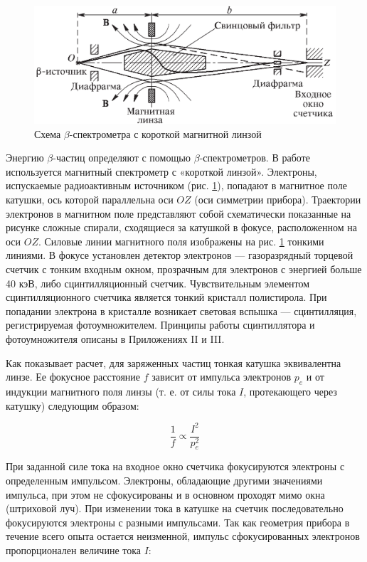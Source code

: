 \documentclass[a4paper,12pt]{article}
\begin{document}
\FloatBarrier
\begin{figure}[h]
    \begin{center}
        \includegraphics[width = 1\textwidth]{pics/ustan_1.png}
        \caption{Схема $\beta$-спектрометра с короткой магнитной линзой}
    \label{pic:ustan-1}
    \end{center}
\end{figure}
\FloatBarrier

Энергию $\beta$-частиц определяют с помощью $\beta$-спектрометров. В работе используется магнитный спектрометр с «короткой линзой». Электроны, испускаемые радиоактивным источником (рис. \ref{pic:ustan-1}), попадают в магнитное поле катушки, ось которой параллельна оси $OZ$ (оси симметрии прибора). Траектории электронов в магнитном поле представляют собой схематически показанные на рисунке сложные спирали, сходящиеся за катушкой в фокусе, расположенном на оси $OZ$. Силовые линии магнитного поля изображены на рис. \ref{pic:ustan-1} тонкими линиями. В фокусе установлен детектор электронов — газоразрядный торцевой счетчик с тонким входным окном, прозрачным для электронов с энергией больше 40 кэВ, либо сцинтилляционный счетчик. Чувствительным элементом сцинтилляционного счетчика является тонкий кристалл полистирола. При попадании электрона в кристалле возникает световая вспышка — сцинтилляция, регистрируемая фотоумножителем. Принципы работы сцинтиллятора и фотоумножителя описаны в Приложениях II и III.

Как показывает расчет, для заряженных частиц тонкая катушка эквивалентна линзе. Ее фокусное расстояние $f$ зависит от импульса электронов $p_e$ и от индукции магнитного поля линзы (т. е. от силы тока $I$, протекающего через катушку) следующим образом:

\begin{equation}\label{eq:11}
    \frac{1}{f} \propto \frac{I^2}{p_e^2}
\end{equation}


При заданной силе тока на входное окно счетчика фокусируются электроны с определенным импульсом. Электроны, обладающие другими значениями импульса, при этом не сфокусированы и в основном проходят мимо окна (штриховой луч). При изменении тока в катушке на счетчик последовательно фокусируются электроны с разными импульсами. Так как геометрия прибора в течение всего опыта остается неизменной, импульс сфокусированных электронов пропорционален величине тока $I$:
\end{document}
